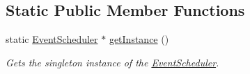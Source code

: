 \subsection*{Static Public Member Functions}
\begin{DoxyCompactItemize}
\item 
static \mbox{\hyperlink{classlib_iterative_robot_1_1_event_scheduler}{Event\+Scheduler}} $\ast$ \mbox{\hyperlink{classlib_iterative_robot_1_1_event_scheduler_a04480f5533265708f49b23e622ffe9cb}{get\+Instance}} ()
\begin{DoxyCompactList}\small\item\em Gets the singleton instance of the \mbox{\hyperlink{classlib_iterative_robot_1_1_event_scheduler}{Event\+Scheduler}}. \end{DoxyCompactList}\end{DoxyCompactItemize}

